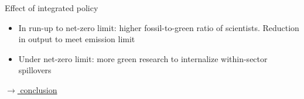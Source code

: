 \documentclass[11pt,aspectratio=169]{beamer}
\begin{document}
\begin{frame}{Effect  of integrated policy}
	\begin{block}{}
			\begin{itemize}
					\item In run-up to net-zero limit: higher fossil-to-green ratio of scientists. Reduction in output to meet emission limit
					\item Under net-zero limit: more green research to internalize within-sector spillovers %
				\end{itemize}
		\end{block}	
	
	\vspace{-5.5mm}
	\hfill
	\hyperlink{conc}{\tiny{$\rightarrow$ conclusion}}
\end{frame}
\end{document}
